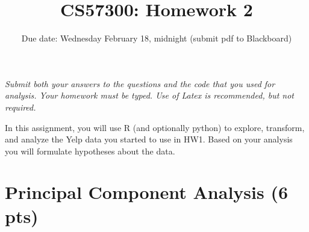 \documentclass[11pt]{article}
\title{
\vspace{-20.mm}
CS57300: Homework 2}
\author{Due date: Wednesday February 18, midnight (submit pdf to Blackboard)}
\date{}                                           %
\begin{document}
\maketitle

\vspace{-8.mm}
\noindent  \emph{Submit both your answers to the questions and the code that you used for analysis. Your homework must be typed. Use of Latex is recommended, but not required. }
\vspace{6.mm}

\noindent In this assignment, you will use R (and optionally python) to explore, transform, and analyze the Yelp data you started to use in HW1. Based on your analysis you will formulate hypotheses about the data. 


\section{Principal Component Analysis (6 pts)}
\end{document}
